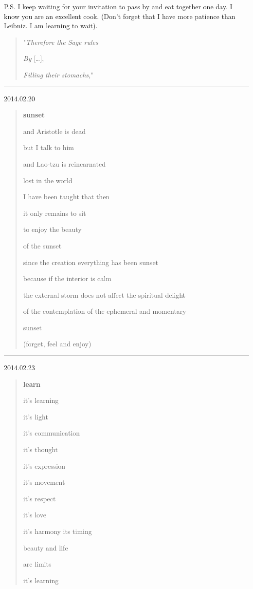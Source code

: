 \documentclass[]{book}
\begin{document}
P.S. I keep waiting for your invitation to pass by and eat together one day. I know you are an excellent cook. (Don't forget that I have more patience than Leibniz. I am learning to wait).

\begin{quote}
"\emph{Therefore the Sage rules}

\emph{By} {[}\ldots{]},

\emph{Filling their stomachs,}"

\citep{ta1984tao}
\end{quote}

\begin{center}\rule{0.5\linewidth}{\linethickness}\end{center}

2014.02.20

\begin{quote}
\textbf{sunset }

and Aristotle is dead

but I talk to him

and Lao-tzu is reincarnated

lost in the world

I have been taught that then

it only remains to sit

to enjoy the beauty

of the sunset

since the creation everything has been sunset

because if the interior is calm

the external storm does not affect the spiritual delight

of the contemplation of the ephemeral and momentary

sunset

(forget, feel and enjoy)
\end{quote}

\begin{center}\rule{0.5\linewidth}{\linethickness}\end{center}

2014.02.23

\begin{quote}
\textbf{learn }

it's learning

it's light

it's communication

it's thought

it's expression

it's movement

it's respect

it's love

it's harmony
its timing

beauty and life

are limits

it's learning
\end{quote}
\end{document}

